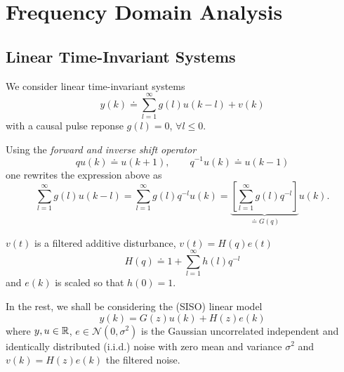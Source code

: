 \chapter{Frequency Domain Analysis}
\label{chap:frequency-domain}

\section{Linear Time-Invariant Systems}
\label{sec:LTI}

We consider linear time-invariant systems
\begin{equation}
  \label{eq:linear-model-pulse}
  y(k) \doteq \sum_{l=1}^\infty g(l)u(k-l) + v(k)
\end{equation}
with a causal pulse reponse $g(l)=0$, $\forall l\le 0$.

Using the \emph{forward and inverse shift operator}~\cite[p.~24]{ljung}
\begin{equation*}
  qu(k) \doteq u(k+1), \hspace{2em} q^{-1}u(k) \doteq u(k-1)
\end{equation*}
one rewrites the expression above as
\begin{equation*}
  \sum_{l=1}^\infty g(l)u(k-l) = \sum_{l=1}^\infty g(l)q^{-l}u(k) = \underbrace{\left[\sum_{l=1}^\infty g(l)q^{-l}\right]}_{\doteq G(q)}u(k).
\end{equation*}

$v(t)$ is a filtered additive disturbance, $v(t)=H(q)e(t)$
\begin{equation*}
  H(q) \doteq 1 + \sum_{l=1}^\infty h(l)q^{-l}
\end{equation*}
and $e(k)$ is scaled so that $h(0)=1$.

In the rest, we shall be considering the (SISO) linear model
\begin{equation}
  \label{eq:linear-model-z}
  y(k) = G(z)u(k) + H(z)e(k)
\end{equation}
where $y,u \in \mathbb{R}$, $e \in \mathcal{N}(0,\sigma^2)$ is the Gaussian uncorrelated independent and identically distributed (i.i.d.) noise with zero mean and variance $\sigma^2$ and $v(k) = H(z)e(k)$ the filtered noise.

